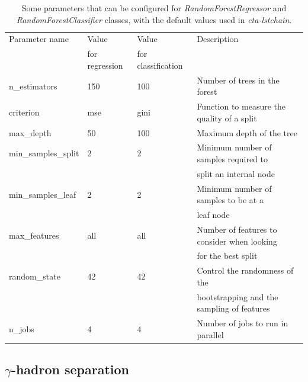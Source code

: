\documentclass[main.tex]{subfiles}
\begin{document}
\begin{table}
  \centering
  \begin{tabular}{|l|l|l|l|}
    \hline
    Parameter name & Value          & Value              & Description\\
                   & for regression & for classification &  \\ 
    \hline
    n\_estimators       & 150 & 100  & \small{Number of trees in the forest}\\
    criterion           & mse & gini & \small{Function to measure the quality of a split}\\
    max\_depth          & 50  & 100  & \small{Maximum depth of the tree}\\
    min\_samples\_split & 2   & 2    & \small{Minimum number of samples required to}\\
                        &     &      & \small{split an internal node} \\ 
    min\_samples\_leaf  & 2   & 2    & \small{Minimum number of samples to be at a}\\
                        &     &      & \small{leaf node} \\     
    max\_features       & all & all  & \small{Number of features to consider when looking} \\
                        &     &      & \small{for the best split}\\
    random\_state       & 42  & 42   & \small{Control the randomness of the} \\
                        &     &      & \small{bootstrapping and the sampling of features}\\
    n\_jobs             & 4   & 4    & \small{Number of jobs to run in parallel}\\
    \hline
  \end{tabular}
  \caption{Some parameters that can be configured for \textit{RandomForestRegressor} and \textit{RandomForestClassifier} classes, with the default values used in \textit{cta-lstchain}.}
  \label{tab:RFpars}
  \end{table}

\subsection{$\gamma$-hadron separation}
\end{document}
